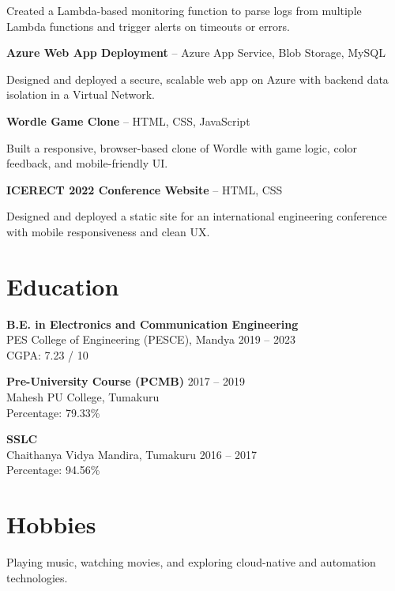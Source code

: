 \documentclass[a4paper,10pt]{article}
\begin{document}
Created a Lambda-based monitoring function to parse logs from multiple Lambda functions and trigger alerts on timeouts or errors.

\textbf{Azure Web App Deployment} – Azure App Service, Blob Storage, MySQL

Designed and deployed a secure, scalable web app on Azure with backend data isolation in a Virtual Network.

\textbf{Wordle Game Clone} – HTML, CSS, JavaScript

Built a responsive, browser-based clone of Wordle with game logic, color feedback, and mobile-friendly UI.

\textbf{ICERECT 2022 Conference Website} – HTML, CSS

Designed and deployed a static site for an international engineering conference with mobile responsiveness and clean UX.

\section*{Education}
\textbf{B.E. in Electronics and Communication Engineering} \\
PES College of Engineering (PESCE), Mandya \hfill 2019 – 2023 \\
CGPA: 7.23 / 10

\textbf{Pre-University Course (PCMB)} \hfill 2017 – 2019 \\
Mahesh PU College, Tumakuru \\
Percentage: 79.33\%

\textbf{SSLC} \\
Chaithanya Vidya Mandira, Tumakuru \hfill 2016 – 2017 \\
Percentage: 94.56\%

\section*{Hobbies}
Playing music, watching movies, and exploring cloud-native and automation technologies.
\end{document}

